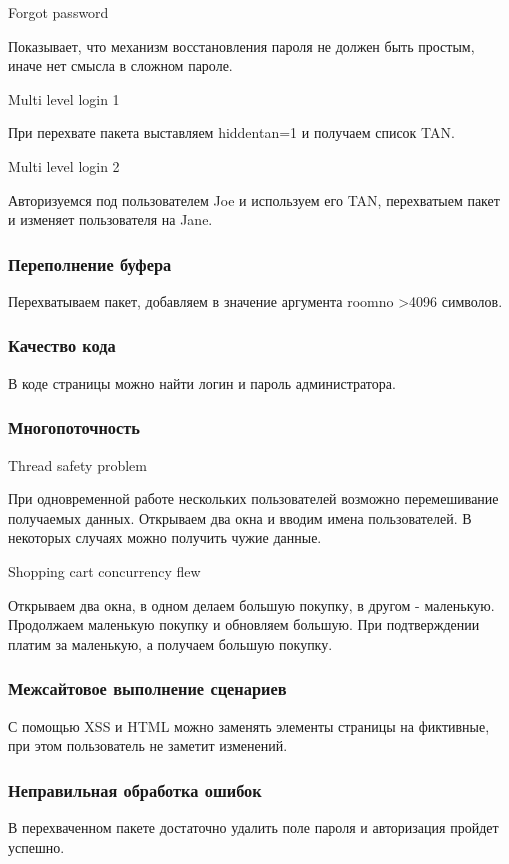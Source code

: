 \documentclass[10pt,a4paper]{article}
\begin{document}
Forgot password

Показывает, что механизм восстановления пароля не должен быть простым, иначе нет смысла в сложном пароле.

Multi level login 1

При перехвате пакета выставляем hiddentan=1 и получаем список TAN.

Multi level login 2

Авторизуемся под пользователем Joe и используем его TAN, перехватыем пакет и изменяет пользователя на Jane.

\subsubsection{Переполнение буфера}
Перехватываем пакет, добавляем в значение аргумента roomno >4096 символов.

\subsubsection{Качество кода}
В коде страницы можно найти логин и пароль администратора.

\subsubsection{Многопоточность}
Thread safety problem

При одновременной работе нескольких пользователей возможно перемешивание получаемых данных. Открываем два окна и вводим имена пользователей. В некоторых случаях можно получить чужие данные.

Shopping cart concurrency flew

Открываем два окна, в одном делаем большую покупку, в другом - маленькую. Продолжаем маленькую покупку и обновляем большую. При подтверждении платим за маленькую, а получаем большую покупку.

\subsubsection{Межсайтовое выполнение сценариев}
С помощью XSS и HTML можно заменять элементы страницы на фиктивные, при этом пользователь не заметит изменений.

\subsubsection{Неправильная обработка ошибок}
В перехваченном пакете достаточно удалить поле пароля и авторизация пройдет успешно.
\end{document}
